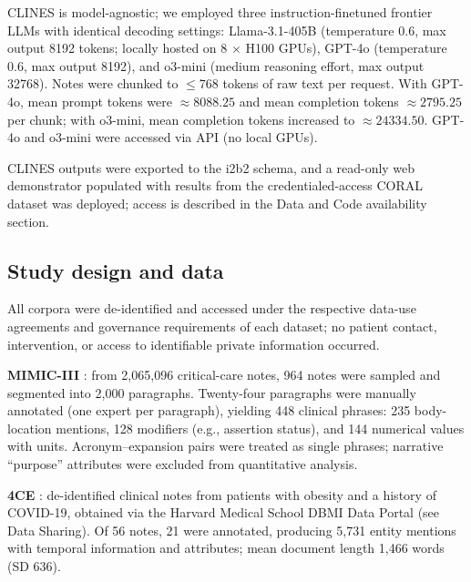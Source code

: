 CLINES is model-agnostic; we employed three instruction-finetuned frontier LLMs with identical decoding settings: Llama-3.1-405B (temperature 0.6, max output 8192 tokens; locally hosted on 8 \(\times\) H100 GPUs), GPT-4o (temperature 0.6, max output 8192), and o3-mini (medium reasoning effort, max output 32768). Notes were chunked to \(\le\)768 tokens of raw text per request. With GPT-4o, mean prompt tokens were $\approx 8088.25$ and mean completion tokens $\approx 2795.25$ per chunk; with o3-mini, mean completion tokens increased to $\approx 24334.50$. GPT-4o and o3-mini were accessed via API (no local GPUs). 

CLINES outputs were exported to the i2b2 schema, and a read-only web demonstrator populated with results from the credentialed-access CORAL dataset was deployed; access is described in the Data and Code availability section.

\subsection{Study design and data}

All corpora were de-identified and accessed under the respective data-use agreements and governance requirements of each dataset; no patient contact, intervention, or access to identifiable private information occurred. 

\textbf{MIMIC-III} \cite{Johnson_2016}: from 2{,}065{,}096 critical-care notes, 964 notes were sampled and segmented into 2{,}000 paragraphs. Twenty-four paragraphs were manually annotated (one expert per paragraph), yielding 448 clinical phrases: 235 body-location mentions, 128 modifiers (e.g., assertion status), and 144 numerical values with units. Acronym--expansion pairs were treated as single phrases; narrative ``purpose'' attributes were excluded from quantitative analysis.

\textbf{4CE} \cite{Brat_2020}: de-identified clinical notes from patients with obesity and a history of COVID-19, obtained via the Harvard Medical School DBMI Data Portal (see Data Sharing). Of 56 notes, 21 were annotated, producing 5{,}731 entity mentions with temporal information and attributes; mean document length 1{,}466 words (SD 636).

